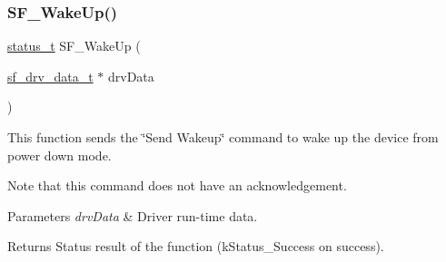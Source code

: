 \subsubsection{\texorpdfstring{SF\_WakeUp()}{SF\_WakeUp()}}
{\footnotesize\ttfamily \mbox{\hyperlink{group__ksdk__common_gaaabdaf7ee58ca7269bd4bf24efcde092}{status\+\_\+t}} S\+F\+\_\+\+Wake\+Up (\begin{DoxyParamCaption}\item[{\mbox{\hyperlink{structsf__drv__data__t}{sf\+\_\+drv\+\_\+data\+\_\+t}} $\ast$}]{drv\+Data }\end{DoxyParamCaption})}



This function sends the \char`\"{}\+Send Wakeup\char`\"{} command to wake up the device from power down mode. 

Note that this command does not have an acknowledgement.


\begin{DoxyParams}{Parameters}
{\em drv\+Data} & Driver run-\/time data.\\
\hline
\end{DoxyParams}
\begin{DoxyReturn}{Returns}
Status result of the function (k\+Status\+\_\+\+Success on success). 
\end{DoxyReturn}
